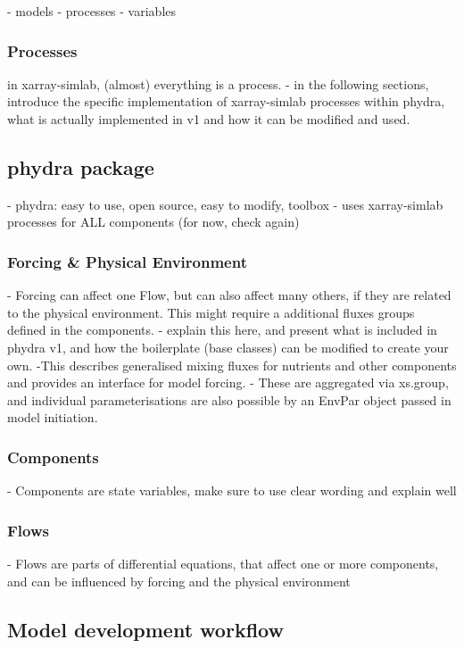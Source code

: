 \documentclass[template.tex]{subfiles}
\begin{document}
- models
- processes
- variables

\subsubsection{Processes}
in xarray-simlab, (almost) everything is a process.
- in the following sections, introduce the specific implementation of xarray-simlab processes within phydra, what is actually implemented in v1 and how it can be modified and used.

\subsection{phydra package}
- phydra: easy to use, open source, easy to modify, toolbox
- uses xarray-simlab processes for ALL components (for now, check again)

\subsubsection{Forcing & Physical Environment} \label{Section:PhysicalEnvironment}
- Forcing can affect one Flow, but can also affect many others, if they are related to the physical environment. This might require a additional fluxes groups defined in the components. 
- explain this here, and present what is included in phydra v1, and how the boilerplate (base classes) can be modified to create your own.
-This describes generalised mixing fluxes for nutrients and other components and provides an interface for model forcing. 
- These are aggregated via xs.group, and individual parameterisations are also possible by an EnvPar object passed in model initiation.

\subsubsection{Components}
- Components are state variables, make sure to use clear wording and explain well

\subsubsection{Flows}
- Flows are parts of differential equations, that affect one or more components, and can be influenced by forcing and the physical environment


\subsection{Model development workflow}
\end{document}
